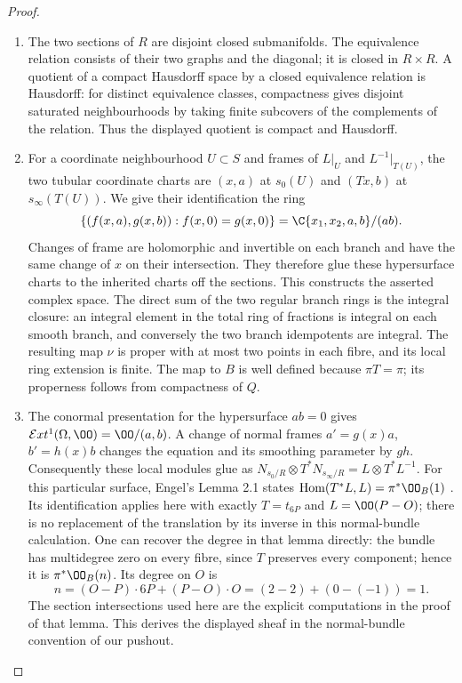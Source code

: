 \begin{proof}
\begin{enumerate}[label=\arabic*.,leftmargin=*]
\item The two sections of $R$ are disjoint closed submanifolds. The
equivalence relation consists of their two graphs and the diagonal;
it is closed in $R\times R$. A quotient of a compact Hausdorff space
by a closed equivalence relation is Hausdorff: for distinct equivalence
classes, compactness gives disjoint saturated neighbourhoods by taking
finite subcovers of the complements of the relation. Thus the displayed
quotient is compact and Hausdorff.

\item For a coordinate neighbourhood $U\subset S$ and frames of $L|_U$ and
$L^{-1}|_{T(U)}$, the two tubular coordinate charts are $(x,a)$ at
$s_0(U)$ and $(Tx,b)$ at $s_\infty(T(U))$. We give their identification
the ring
\[
 \{(f(x,a),g(x,b)):f(x,0)=g(x,0)\}
   =\C\{x_1,x_2,a,b\}/(ab).
\]
Changes of frame are holomorphic and invertible on each branch and
have the same change of $x$ on their intersection. They therefore glue
these hypersurface charts to the inherited charts off the sections.
This constructs the asserted complex space. The direct sum of the two
regular branch rings is the integral closure: an integral element in
the total ring of fractions is integral on each smooth branch, and
conversely the two branch idempotents are integral. The resulting map
$\nu$ is proper with at most two points in each fibre, and its local
ring extension is finite. The map to $B$ is well defined because
$\pi T=\pi$; its properness follows from compactness of $Q$.

\item The conormal presentation for the hypersurface $ab=0$ gives
$\mathcal Ext^1(\Omega,\OO)=\OO/(a,b)$. A change of normal frames
$a'=g(x)a$, $b'=h(x)b$ changes the equation and its smoothing parameter
by $gh$. Consequently these local modules glue as
$N_{s_0/R}\otimes T^*N_{s_\infty/R}=L\otimes T^*L^{-1}$.
For this particular surface, Engel's Lemma 2.1 states
$\operatorname{Hom}(T^*L,L)=\pi^*\OO_B(1)$ \cite[Lemma 2.1]{Engel2026}.
Its identification applies here with exactly $T=t_{6P}$ and $L=\OO(P-O)$;
there is no replacement of the translation by its inverse in this
normal-bundle calculation. One can recover the degree in that lemma
directly: the bundle has multidegree zero on every fibre, since $T$
preserves every component; hence it is $\pi^*\OO_B(n)$. Its degree on
$O$ is
\[
 n=(O-P)\cdot 6P+(P-O)\cdot O=(2-2)+(0-(-1))=1.
\]
The section intersections used here are the explicit computations in
the proof of that lemma. This derives the displayed sheaf in the
normal-bundle convention of our pushout.
\end{enumerate}
\end{proof}

